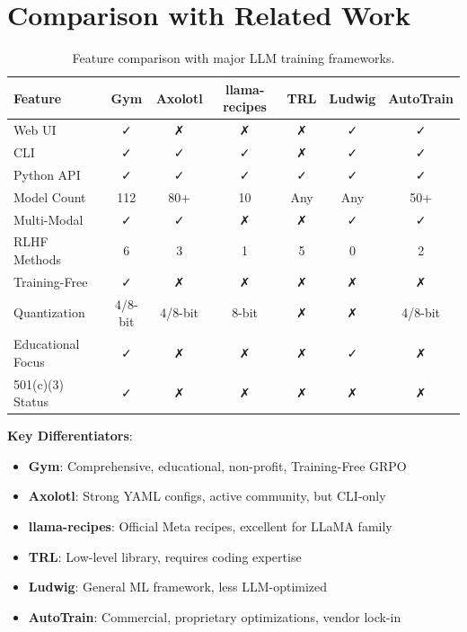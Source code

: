 \section{Comparison with Related Work}


\begin{table}[h]
\centering
\small
\begin{tabular}{lcccccc}
\toprule
Feature & Gym & Axolotl & llama-recipes & TRL & Ludwig & AutoTrain \\
\midrule
Web UI & ✓ & ✗ & ✗ & ✗ & ✓ & ✓ \\
CLI & ✓ & ✓ & ✓ & ✗ & ✓ & ✓ \\
Python API & ✓ & ✓ & ✓ & ✓ & ✓ & ✓ \\
Model Count & 112 & 80+ & 10 & Any & Any & 50+ \\
Multi-Modal & ✓ & ✓ & ✗ & ✗ & ✓ & ✓ \\
RLHF Methods & 6 & 3 & 1 & 5 & 0 & 2 \\
Training-Free & ✓ & ✗ & ✗ & ✗ & ✗ & ✗ \\
Quantization & 4/8-bit & 4/8-bit & 8-bit & ✗ & ✗ & 4/8-bit \\
Educational Focus & ✓ & ✗ & ✗ & ✗ & ✓ & ✗ \\
501(c)(3) Status & ✓ & ✗ & ✗ & ✗ & ✗ & ✗ \\
\bottomrule
\end{tabular}
\caption{Feature comparison with major LLM training frameworks.}
\end{table}

\textbf{Key Differentiators}:
\begin{itemize}
\item \textbf{Gym}: Comprehensive, educational, non-profit, Training-Free GRPO
\item \textbf{Axolotl}: Strong YAML configs, active community, but CLI-only
\item \textbf{llama-recipes}: Official Meta recipes, excellent for LLaMA family
\item \textbf{TRL}: Low-level library, requires coding expertise
\item \textbf{Ludwig}: General ML framework, less LLM-optimized
\item \textbf{AutoTrain}: Commercial, proprietary optimizations, vendor lock-in
\end{itemize}

